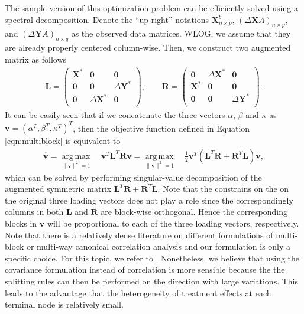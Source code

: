\documentclass[smallextended]{svjour3}
\DeclareMathOperator*{\argmax}{arg\,max}
\begin{document}
The sample version of this optimization problem can be efficiently solved using a spectral decomposition. Denote the ``up-right'' notations $\textbf{X}^b_{n \times p}$, $(\Delta \textbf{X}A)_{n \times p}$, and $(\Delta \textbf{Y}A)_{n \times q}$ as the observed data matrices. WLOG, we assume that they are already properly centered column-wise. Then, we construct two augmented matrix as follows
\begin{align*}
\textbf{L} = \begin{pmatrix}
\textbf{X}^* & \textbf{0} & \textbf{0} \\
\textbf{0} & \textbf{0} &\Delta \textbf{Y}^*\\
\textbf{0} & \Delta \textbf{X}^*& \textbf{0}\\
\end{pmatrix},
\qquad
\textbf{R} = \begin{pmatrix}
\textbf{0} & \Delta \textbf{X}^* & \textbf{0}\\
\textbf{X}^* & \textbf{0} & \textbf{0} \\
\textbf{0} & \textbf{0} &\Delta \textbf{Y}^*\\
\end{pmatrix}.
\end{align*}
It can be easily seen that if we concatenate the three vectors $\alpha$, $\beta$ and $\kappa$ as $\bm{v} = (\alpha^T, \beta^T, \kappa^T)^T$, then the objective function defined in Equation \eqref{eqn:multiblock} is equivalent to 
\begin{align}
\widehat{\bm{v}} = \argmax\limits_{\lVert\bm{v}\rVert^2 = 1} \quad \bm{v}^T \textbf{L}^T \textbf{R} \bm{v}
= \argmax\limits_{\lVert\bm{v}\rVert^2 = 1} \quad \frac{1}{2} \bm{v}^T (\textbf{L}^T \textbf{R} + \textbf{R}^T \textbf{L}) \bm{v},
\end{align}
which can be solved by performing singular-value decomposition of the augmented symmetric matrix $\textbf{L}^T \textbf{R} + \textbf{R}^T \textbf{L}$. Note that the constrains on the on the original three loading vectors does not play a role since the correspondingly columns in both $\textbf{L}$ and $\textbf{R}$ are block-wise orthogonal. Hence the corresponding blocks in $\bm{v}$ will be proportional to each of the three loading vectors, respectively. Note that there is a relatively dense literature on different formulations of multi-block or multi-way canonical correlation analysis and our formulation is only a specific choice. For this topic, we refer to \cite{tenenhaus2017regularized}. Nonetheless, we believe that using the covariance formulation instead of correlation is more sensible because the the splitting rules can then be performed on the direction with large variations. This leads to the advantage that the heterogeneity of treatment effects at each terminal node is relatively small. 
\end{document}

